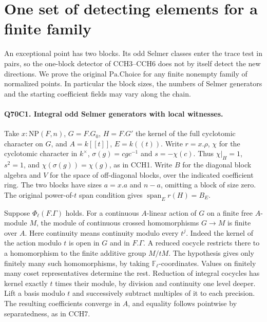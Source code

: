 \section{One set of detecting elements for a finite family}

An exceptional point has two blocks. Its odd Selmer classes enter the
trace test in pairs, so the one-block detector of CCH3--CCH6 does not
by itself detect the new directions. We prove the original
$\mathrm{Pa.Choice}$ for any finite nonempty family of normalized
points. In particular the block sizes, the numbers of Selmer generators
and the starting coefficient fields may vary along the chain.

\paragraph{Q70C1. Integral odd Selmer generators with local witnesses.}
Take $x:\mathrm{NP}(F,n)$, $G=F.G_0$, $H=F.G'$ the kernel of the
full cyclotomic character on $G$, and $A=k[[t]]$, $E=k((t))$.
Write $r=x.\rho$, $\chi$ for the cyclotomic character in $k^\times$,
$\sigma(g)=cgc^{-1}$ and $s=-\chi(c)$. Thus $\chi|_H=1$,
$s^2=1$, and $\chi(\sigma(g))=\chi(g)$, as in CCH1.
Write $B$ for the diagonal block algebra and $V$ for the space of
off-diagonal blocks, over the indicated coefficient ring. The two
blocks have sizes $a=x.a$ and $n-a$, omitting a block of size zero.
The original power-of-$t$ span condition gives
$\operatorname{span}_E r(H)=B_E$.

Suppose $\Phi_\ell(F.\Gamma)$ holds. For a continuous $A$-linear
action of $G$ on a finite free $A$-module $M$, the module of
continuous crossed homomorphisms $G\to M$ is finite over $A$.
Here continuity means continuity modulo every $t^j$. Indeed the
kernel of the action modulo $t$ is open in $G$ and in $F.\Gamma$.
A reduced cocycle restricts there to a homomorphism to the finite
additive group $M/tM$. The hypothesis gives only finitely many such
homomorphisms, by taking $\mathbb F_\ell$-coordinates. Values on
finitely many coset representatives determine the rest. Reduction of
integral cocycles has kernel exactly $t$ times their module, by
division and continuity one level deeper. Lift a basis modulo $t$ and
successively subtract multiples of it to each precision. The resulting
coefficients converge in $A$, and equality follows pointwise by
separatedness, as in CCH7.

